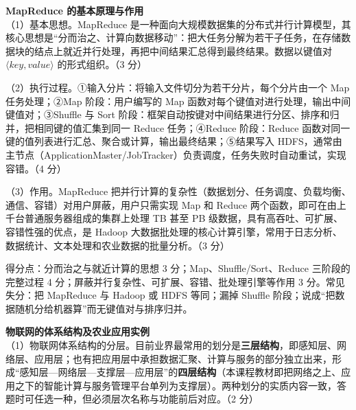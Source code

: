 \documentclass[a4paper,11pt]{article}
\begin{document}
\q \textbf{MapReduce 的基本原理与作用}\\
（1）基本思想。MapReduce 是一种面向大规模数据集的分布式并行计算模型，其核心思想是“分而治之、计算向数据移动”：把大任务分解为若干子任务，在存储数据块的结点上就近并行处理，再把中间结果汇总得到最终结果。数据以键值对 $\langle key, value \rangle$ 的形式组织。（3 分）

（2）执行过程。①输入分片：将输入文件切分为若干分片，每个分片由一个 Map 任务处理；②Map 阶段：用户编写的 Map 函数对每个键值对进行处理，输出中间键值对；③Shuffle 与 Sort 阶段：框架自动按键对中间结果进行分区、排序和归并，把相同键的值汇集到同一 Reduce 任务；④Reduce 阶段：Reduce 函数对同一键的值列表进行汇总、聚合或计算，输出最终结果；⑤结果写入 HDFS，通常由主节点（ApplicationMaster/JobTracker）负责调度，任务失败时自动重试，实现容错。（4 分）

（3）作用。MapReduce 把并行计算的复杂性（数据划分、任务调度、负载均衡、通信、容错）对用户屏蔽，用户只需实现 Map 和 Reduce 两个函数，即可在由上千台普通服务器组成的集群上处理 TB 甚至 PB 级数据，具有高吞吐、可扩展、容错性强的优点，是 Hadoop 大数据批处理的核心计算引擎，常用于日志分析、数据统计、文本处理和农业数据的批量分析。（3 分）
\begin{analysis}得分点：分而治之与就近计算的思想 3 分；Map、Shuffle/Sort、Reduce 三阶段的完整过程 4 分；屏蔽并行复杂性、可扩展、容错、批处理引擎等作用 3 分。常见失分：把 MapReduce 与 Hadoop 或 HDFS 等同；漏掉 Shuffle 阶段；说成“把数据随机分给机器算”而无键值对与排序归并。\end{analysis}

\q \textbf{物联网的体系结构及农业应用实例}\\
（1）物联网体系结构的分层。目前业界最常用的划分是\textbf{三层结构}，即感知层、网络层、应用层；也有把应用层中承担数据汇聚、计算与服务的部分独立出来，形成“感知层—网络层—支撑层—应用层”的\textbf{四层结构}（本课程教材即把网络之上、应用之下的智能计算与服务管理平台单列为支撑层）。两种划分的实质内容一致，答题时可任选一种，但必须层次名称与功能前后对应。（2 分）
\end{document}
